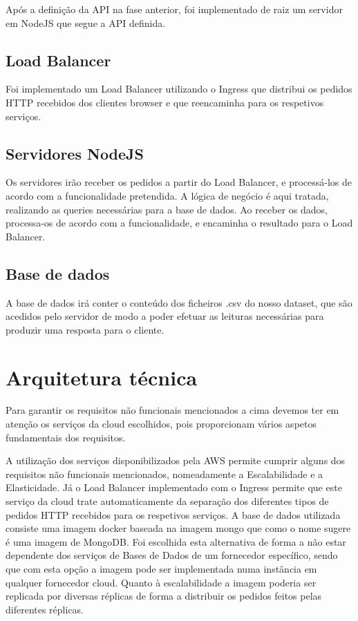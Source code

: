 \documentclass[11pt,a4paper]{article}
\begin{document}
Após a definição da API na fase anterior, foi implementado de raiz um servidor em NodeJS que segue a API definida.


\subsection{Load Balancer}
Foi implementado um Load Balancer utilizando o Ingress que distribui os pedidos HTTP recebidos dos clientes browser e que reencaminha para os respetivos serviços.


\subsection{Servidores NodeJS}
Os servidores irão receber os pedidos a partir do Load Balancer, e processá-los de acordo com a funcionalidade pretendida. A lógica de negócio é aqui tratada, realizando as queries necessárias para a base de dados. Ao receber os dados, processa-os de acordo com a funcionalidade, e encaminha o resultado para o Load Balancer.

\subsection{Base de dados}
A base de dados irá conter o conteúdo dos ficheiros .csv do nosso dataset, que são acedidos pelo servidor de modo a poder efetuar as leituras necessárias para produzir uma resposta para o cliente. 
\newpage

\section{Arquitetura técnica}

Para garantir os requisitos não funcionais mencionados a cima devemos ter em atenção os serviços da cloud escolhidos, pois proporcionam vários aspetos fundamentais dos requisitos.
\newline

A utilização dos serviços disponibilizados pela AWS permite cumprir alguns dos requisitos não funcionais mencionados, nomeadamente a Escalabilidade e a Elasticidade. Já o Load Balancer implementado com o Ingress permite que este serviço da cloud trate automaticamente da separação dos diferentes tipos de pedidos HTTP recebidos para os respetivos serviços. A base de dados utilizada consiste uma imagem docker baseada na imagem mongo que como o nome sugere é uma imagem de MongoDB. Foi escolhida esta alternativa de forma a não estar dependente dos serviços de Bases de Dados de um fornecedor específico, sendo que com esta opção a imagem pode ser implementada numa instância em qualquer fornecedor cloud. Quanto à escalabilidade a imagem poderia ser replicada por diversas réplicas de forma a distribuir os pedidos feitos pelas diferentes réplicas.  %
\newline
\end{document}
